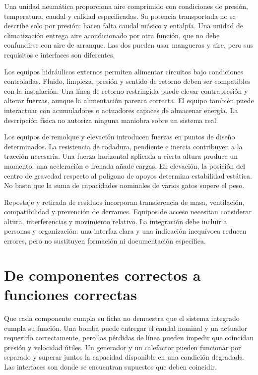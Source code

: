 Una unidad neumática proporciona aire comprimido con condiciones de presión, temperatura, caudal y calidad especificadas. Su potencia transportada no se describe solo por presión: hacen falta caudal másico y entalpía. Una unidad de climatización entrega aire acondicionado por otra función, que no debe confundirse con aire de arranque. Las dos pueden usar mangueras y aire, pero sus requisitos e interfaces son diferentes.

Los equipos hidráulicos externos permiten alimentar circuitos bajo condiciones controladas. Fluido, limpieza, presión y sentido de retorno deben ser compatibles con la instalación. Una línea de retorno restringida puede elevar contrapresión y alterar fuerzas, aunque la alimentación parezca correcta. El equipo también puede interactuar con acumuladores o actuadores capaces de almacenar energía. La descripción física no autoriza ninguna maniobra sobre un sistema real.

Los equipos de remolque y elevación introducen fuerzas en puntos de diseño determinados. La resistencia de rodadura, pendiente e inercia contribuyen a la tracción necesaria. Una fuerza horizontal aplicada a cierta altura produce un momento; una aceleración o frenada añade cargas. En elevación, la posición del centro de gravedad respecto al polígono de apoyos determina estabilidad estática. No basta que la suma de capacidades nominales de varios gatos supere el peso.

Repostaje y retirada de residuos incorporan transferencia de masa, ventilación, compatibilidad y prevención de derrames. Equipos de acceso necesitan considerar altura, interferencias y movimiento relativo. La integración debe incluir a personas y organización: una interfaz clara y una indicación inequívoca reducen errores, pero no sustituyen formación ni documentación específica.

\section{De componentes correctos a funciones correctas}
Que cada componente cumpla su ficha no demuestra que el sistema integrado cumpla su función. Una bomba puede entregar el caudal nominal y un actuador requerirlo correctamente, pero las pérdidas de línea pueden impedir que coincidan presión y velocidad útiles. Un generador y un calefactor pueden funcionar por separado y superar juntos la capacidad disponible en una condición degradada. Las interfaces son donde se encuentran supuestos que deben coincidir.

